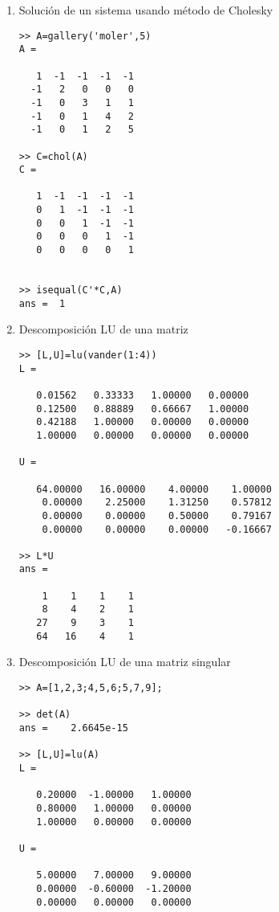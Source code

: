 \documentclass[letter,11pt]{article}
\begin{document}
\begin{multicols}{2}
\begin{enumerate}
\begin{verbatim}
   1   0   0
   0   1   0
   0   0   1

R =

   1   2   3
   0   1   1
   0   0   1

>> x=Q\R\[1;1;1]
x =

  -2
   0
   1

\end{verbatim}

\item Soluci\'on de un sistema usando m\'etodo de Cholesky
\begin{verbatim}
>> A=gallery('moler',5)
A =

   1  -1  -1  -1  -1
  -1   2   0   0   0
  -1   0   3   1   1
  -1   0   1   4   2
  -1   0   1   2   5

>> C=chol(A)
C =

   1  -1  -1  -1  -1
   0   1  -1  -1  -1
   0   0   1  -1  -1
   0   0   0   1  -1
   0   0   0   0   1


>> isequal(C'*C,A)
ans =  1
\end{verbatim}
\item Descomposici\'on LU de una matriz
\begin{verbatim}
>> [L,U]=lu(vander(1:4))
L =

   0.01562   0.33333   1.00000   0.00000
   0.12500   0.88889   0.66667   1.00000
   0.42188   1.00000   0.00000   0.00000
   1.00000   0.00000   0.00000   0.00000

U =

   64.00000   16.00000    4.00000    1.00000
    0.00000    2.25000    1.31250    0.57812
    0.00000    0.00000    0.50000    0.79167
    0.00000    0.00000    0.00000   -0.16667

>> L*U
ans =

    1    1    1    1
    8    4    2    1
   27    9    3    1
   64   16    4    1
\end{verbatim}

\item Descomposici\'on LU de una matriz singular
\begin{verbatim}
>> A=[1,2,3;4,5,6;5,7,9];

>> det(A)
ans =    2.6645e-15

>> [L,U]=lu(A)
L =

   0.20000  -1.00000   1.00000
   0.80000   1.00000   0.00000
   1.00000   0.00000   0.00000

U =

   5.00000   7.00000   9.00000
   0.00000  -0.60000  -1.20000
   0.00000   0.00000   0.00000
\end{verbatim}

\end{enumerate}
\end{multicols}
\end{document}
